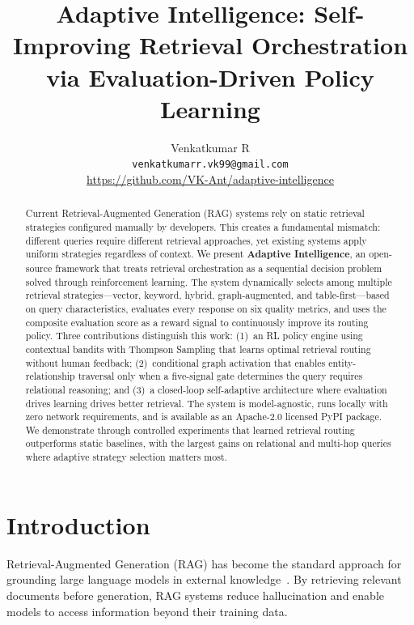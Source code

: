 \documentclass[11pt]{article}
\title{\textbf{Adaptive Intelligence: Self-Improving Retrieval Orchestration\\via Evaluation-Driven Policy Learning}}
\author{
    Venkatkumar R\\
    \texttt{venkatkumarr.vk99@gmail.com}\\[6pt]
    \small\url{https://github.com/VK-Ant/adaptive-intelligence}
}
\date{}
\begin{document}
\maketitle

\begin{abstract}

Current Retrieval-Augmented Generation (RAG) systems rely on static retrieval strategies configured manually by developers. This creates a fundamental mismatch: different queries require different retrieval approaches, yet existing systems apply uniform strategies regardless of context. We present \textbf{Adaptive Intelligence}, an open-source framework that treats retrieval orchestration as a sequential decision problem solved through reinforcement learning. The system dynamically selects among multiple retrieval strategies---vector, keyword, hybrid, graph-augmented, and table-first---based on query characteristics, evaluates every response on six quality metrics, and uses the composite evaluation score as a reward signal to continuously improve its routing policy. Three contributions distinguish this work: (1)~an RL policy engine using contextual bandits with Thompson Sampling that learns optimal retrieval routing without human feedback; (2)~conditional graph activation that enables entity-relationship traversal only when a five-signal gate determines the query requires relational reasoning; and (3)~a closed-loop self-adaptive architecture where evaluation drives learning drives better retrieval. The system is model-agnostic, runs locally with zero network requirements, and is available as an Apache-2.0 licensed PyPI package. We demonstrate through controlled experiments that learned retrieval routing outperforms static baselines, with the largest gains on relational and multi-hop queries where adaptive strategy selection matters most.

\end{abstract}

\section{Introduction}
\label{sec:intro}

Retrieval-Augmented Generation (RAG) has become the standard approach for grounding large language models in external knowledge~\cite{lewis2020rag}. By retrieving relevant documents before generation, RAG systems reduce hallucination and enable models to access information beyond their training data.
\end{document}
